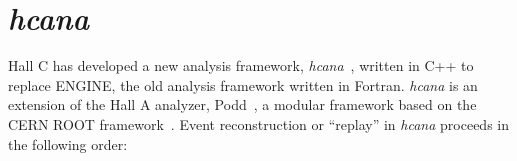 \section{\textit{hcana}}
Hall C has developed a new analysis framework,
\textit{hcana}~\cite{hcana_github}, written in C++ to replace ENGINE, the old
analysis framework written in Fortran.
\textit{hcana} is an extension of the Hall A analyzer, Podd~\cite{podd_github},
a modular framework based on the CERN ROOT framework~\cite{cern_root}.
Event reconstruction or ``replay'' in \textit{hcana} proceeds in the following order:

